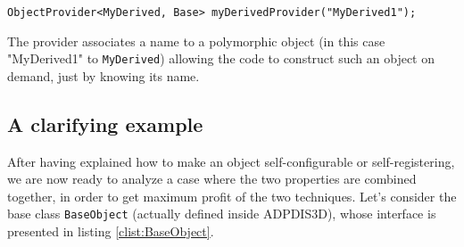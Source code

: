 \documentclass[11pt]{article}
\newcommand{\noi}{\noindent}
\begin{document}
\begin{enumerate}
\begin{lstlisting}[basicstyle={\small\sffamily},float=!htb,caption={ObjectProvider
    defined in DerivedClass.cxx.}, label=clist:ObjectProvider]
  ObjectProvider<MyDerived, Base> myDerivedProvider("MyDerived1");
\end{lstlisting}
\noi
The provider associates a name to a polymorphic object (in this case
"MyDerived1" to \texttt{MyDerived}) allowing the code to construct
such an object on demand, just by knowing its name.
\end{enumerate}

\subsection{A clarifying example} \label{ssec:example}

After having explained how to make an object self-configurable or 
self-registering, we are now ready to analyze a case where the two
properties are combined together, in order to get maximum profit of the 
two techniques. Let's consider the base class \texttt{BaseObject} 
(actually defined inside ADPDIS3D), whose interface is presented 
in listing \ref{clist:BaseObject}.
\end{document}
